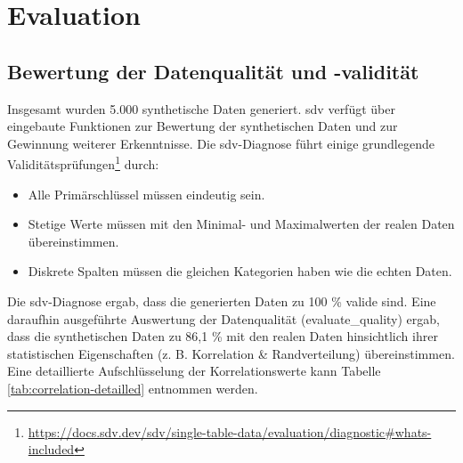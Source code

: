 \chapter{Evaluation}
\label{cha:evaluation}

\section{Bewertung der Datenqualität und -validität}
\begin{spacing}{1.5}

Insgesamt wurden 5.000 synthetische Daten generiert. \acrshort{sdv} verfügt über eingebaute Funktionen zur Bewertung der synthetischen Daten und zur Gewinnung weiterer Erkenntnisse. Die \acrshort{sdv}-Diagnose führt einige grundlegende Validitätsprüfungen\footnote{\url{https://docs.sdv.dev/sdv/single-table-data/evaluation/diagnostic\#whats-included}} durch:

\begin{itemize}
  \item Alle Primärschlüssel müssen eindeutig sein.
  \item Stetige Werte müssen mit den Minimal- und Maximalwerten der realen Daten übereinstimmen.
  \item Diskrete Spalten müssen die gleichen Kategorien haben wie die echten Daten.
\end{itemize}

Die \acrshort{sdv}-Diagnose ergab, dass die generierten Daten zu 100 \% valide sind. Eine daraufhin ausgeführte Auswertung der Datenqualität (evaluate\_quality) ergab, dass die synthetischen Daten zu 86,1 \% mit den realen Daten hinsichtlich ihrer statistischen Eigenschaften (z. B. Korrelation \& Randverteilung) übereinstimmen. Eine detaillierte Aufschlüsselung der Korrelationswerte kann Tabelle \ref{tab:correlation-detailled} entnommen werden.

\newpage


\end{spacing}
